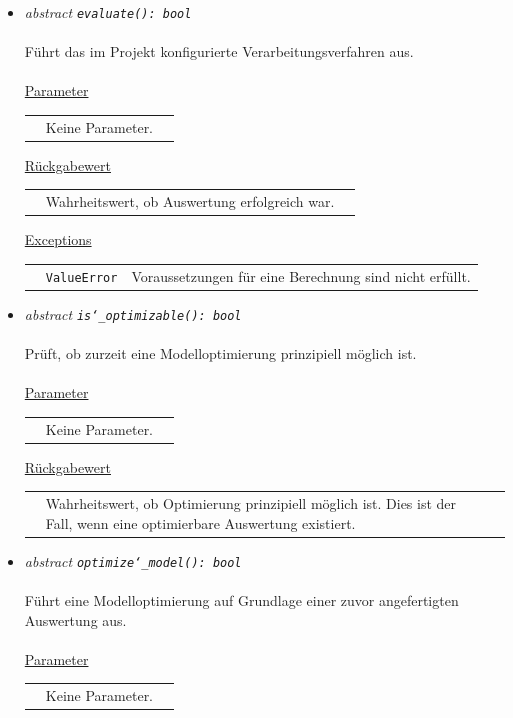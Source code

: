 \documentclass{article}
\begin{document}
\begin{itemize}
\item \textit{\flqq{}abstract\frqq} \texttt{\textit{evaluate(): bool}}\\\\
Führt das im Projekt konfigurierte Verarbeitungsverfahren aus.
\\\\
\underline{Parameter}\\
\begin{tabular}{lll}
 & Keine Parameter.\\
\end{tabular}

\underline{Rückgabewert}\\
\begin{tabular}{lll}
 & Wahrheitswert, ob Auswertung erfolgreich war.\\
\end{tabular}

\underline{Exceptions}\\
\begin{tabular}{lll}
 & \texttt{ValueError} & Voraussetzungen für eine Berechnung sind nicht erfüllt.\\
\end{tabular}


\item \textit{\flqq{}abstract\frqq} \texttt{\textit{is\char`_optimizable(): bool}}\\\\
Prüft, ob zurzeit eine Modelloptimierung prinzipiell möglich ist.\\\\
\underline{Parameter}\\
\begin{tabular}{lll}
 & Keine Parameter.
\end{tabular}

\underline{Rückgabewert}\\
\begin{tabular}{lll}
 & Wahrheitswert, ob Optimierung prinzipiell möglich ist. Dies ist der Fall, wenn eine optimierbare Auswertung existiert.\\
\end{tabular}


\item \textit{\flqq{}abstract\frqq} \texttt{\textit{optimize\char`_model(): bool}}\\\\
Führt eine Modelloptimierung auf Grundlage einer zuvor angefertigten Auswertung aus.
\\\\
\underline{Parameter}\\
\begin{tabular}{lll}
 & Keine Parameter.\\
\end{tabular}


\end{itemize}
\end{document}
